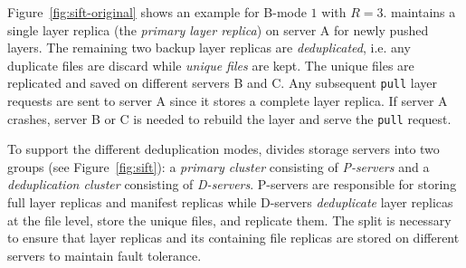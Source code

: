 %
Figure~\ref{fig:sift-original} shows an example for B-mode $1$ with $R=3$.
\sysname maintains a single layer replica (the \emph{primary layer replica}) on server A for newly 
pushed layers.
%
%
The remaining two backup layer replicas %
are \emph{deduplicated}, i.e. any
duplicate files are discard while \emph{unique files} are kept.
The unique files are replicated and saved on different servers B and C.
%
%
%
Any subsequent \texttt{pull} layer requests are sent to server A since it stores a complete layer replica.
If server A crashes, server B or C is needed to rebuild the layer and serve the \texttt{pull} request.

To support the different deduplication modes, \sysname divides storage servers into two 
groups (see Figure~\ref{fig:sift}):
a \emph{primary cluster} consisting of \emph{P-servers} and a \emph{deduplication cluster}
consisting of \emph{D-servers}.
P-servers are responsible for storing full layer replicas and manifest replicas
while D-servers \emph{deduplicate} layer replicas at the file level, 
store the unique files, and replicate them.
%
The split is necessary to ensure that
layer replicas and its containing file replicas are stored on different servers to maintain
fault tolerance.

